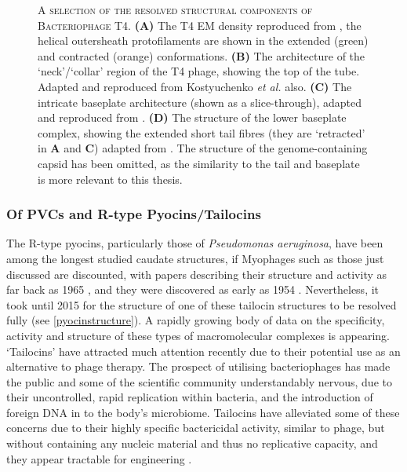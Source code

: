 \begin{figure}[p]
{{  }\cr
}
	\captionsetup{singlelinecheck=off, justification=justified, font=footnotesize, aboveskip=10pt}
	\caption[Resolved T4 Bacteriophage Structures from literature]{\textsc{\normalsize A selection of the resolved structural components of Bacteriophage T4.}\vspace{0.1cm} \newline \textbf{(A)} The T4 EM density reproduced from \cite{Kostyuchenko2005}, the helical outersheath protofilaments are shown in the extended (green) and contracted (orange) conformations. \textbf{(B)} The architecture of the `neck'/`collar' region of the T4 phage, showing the top of the tube. Adapted and  reproduced from Kostyuchenko \emph{et al.} also. \textbf{(C)} The intricate baseplate architecture (shown as a slice-through), adapted and reproduced from \cite{Kostyuchenko2003}. \textbf{(D)} The structure of the lower baseplate complex, showing the extended short tail fibres (they are `retracted' in \textbf{A} and \textbf{C}) adapted from \cite{Taylor2016}. The structure of the genome-containing capsid has been omitted, as the similarity to the tail and baseplate is more relevant to this thesis.}
	\label{t4structure}
\end{figure}

\clearpage

\subsubsection{Of PVCs and R-type Pyocins/Tailocins}
The R-type pyocins, particularly those of \emph{Pseudomonas aeruginosa}, have been among the longest studied caudate structures, if Myophages such as those just discussed are discounted, with papers describing their structure and activity as far back as 1965 \citep{Ishii1965}, and they were discovered as early as 1954 \citep{jacob1954biosynthese}. Nevertheless, it took until 2015 for the structure of one of these tailocin structures to be resolved fully \citep{Ge2015} (see \vref{pyocinstructure}). A rapidly growing body of data on the specificity, activity and structure of these types of macromolecular complexes is appearing. `Tailocins' have attracted much attention recently due to their potential use as an alternative to phage therapy. The prospect of utilising bacteriophages has made the public and some of the scientific community understandably nervous, due to their uncontrolled, rapid replication within bacteria, and the introduction of foreign DNA in to the body's microbiome. Tailocins have alleviated some of these concerns due to their highly specific bactericidal activity, similar to phage, but without containing any nucleic material and thus no replicative capacity, and they appear tractable for engineering \citep{Scholl2008}.


